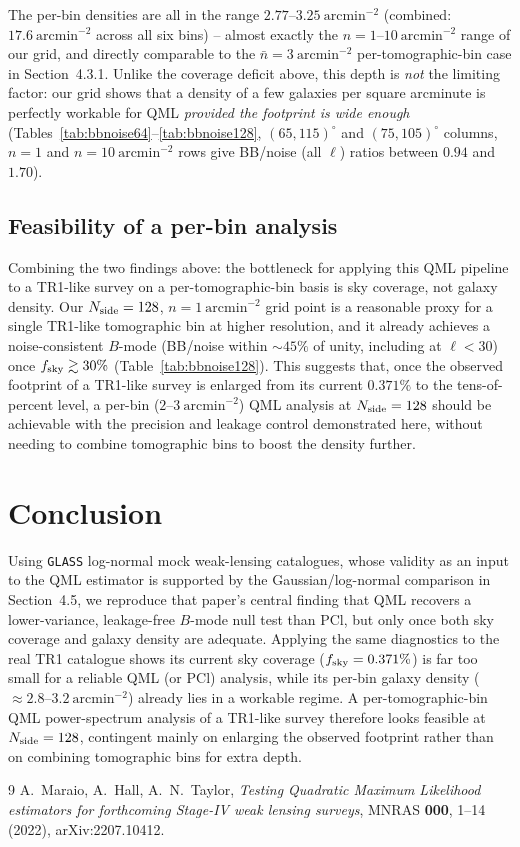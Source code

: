 \documentclass[11pt]{article}
\begin{document}
The per-bin densities are all in the range $2.77$--$3.25\ \mathrm{arcmin}^{-2}$
(combined: $17.6\ \mathrm{arcmin}^{-2}$ across all six bins) -- almost exactly the
$n=1$--$10\ \mathrm{arcmin}^{-2}$ range of our grid, and directly comparable to the
$\bar n=3\ \mathrm{arcmin}^{-2}$ per-tomographic-bin case in \citet{Maraio2022}
Section~4.3.1. Unlike the coverage deficit above, this depth is \emph{not} the limiting
factor: our grid shows that a density of a few galaxies per square arcminute is
perfectly workable for QML \emph{provided the footprint is wide enough}
(Tables~\ref{tab:bbnoise64}--\ref{tab:bbnoise128}, $(65,115)^\circ$ and $(75,105)^\circ$
columns, $n=1$ and $n=10\ \mathrm{arcmin}^{-2}$ rows give BB/noise (all $\ell$) ratios
between $0.94$ and $1.70$).

\subsection{Feasibility of a per-bin analysis}

Combining the two findings above: the bottleneck for applying this QML pipeline to a
TR1-like survey on a per-tomographic-bin basis is sky coverage, not galaxy density. Our
$N_{\rm side}=128$, $n=1\ \mathrm{arcmin}^{-2}$ grid point is a reasonable proxy for a
single TR1-like tomographic bin at higher resolution, and it already achieves a
noise-consistent $B$-mode (BB/noise within $\sim\!45\%$ of unity, including at
$\ell<30$) once $f_{\rm sky}\gtrsim30\%$ (Table~\ref{tab:bbnoise128}). This suggests
that, once the observed footprint of a TR1-like survey is enlarged from its current
$0.371\%$ to the tens-of-percent level, a per-bin ($2$--$3\ \mathrm{arcmin}^{-2}$) QML
analysis at $N_{\rm side}=128$ should be achievable with the precision and leakage
control demonstrated here, without needing to combine tomographic bins to boost the
density further.

\section{Conclusion}

Using \texttt{GLASS} log-normal mock weak-lensing catalogues, whose validity as an input
to the QML estimator is supported by the Gaussian/log-normal comparison in
\citet{Maraio2022} Section~4.5, we reproduce that paper's central finding that QML
recovers a lower-variance, leakage-free $B$-mode null test than PCl, but only once both
sky coverage and galaxy density are adequate. Applying the same diagnostics to the real
TR1 catalogue shows its current sky coverage ($f_{\rm sky}=0.371\%$) is far too small for
a reliable QML (or PCl) analysis, while its per-bin galaxy density
($\approx 2.8$--$3.2\ \mathrm{arcmin}^{-2}$) already lies in a workable regime. A
per-tomographic-bin QML power-spectrum analysis of a TR1-like survey therefore looks
feasible at $N_{\rm side}=128$, contingent mainly on enlarging the observed footprint
rather than on combining tomographic bins for extra depth.

\begin{thebibliography}{9}
A.~Maraio, A.~Hall, A.~N.~Taylor,
\emph{Testing Quadratic Maximum Likelihood estimators for forthcoming Stage-IV weak
lensing surveys},
MNRAS \textbf{000}, 1--14 (2022), arXiv:2207.10412.
\end{thebibliography}
\end{document}
